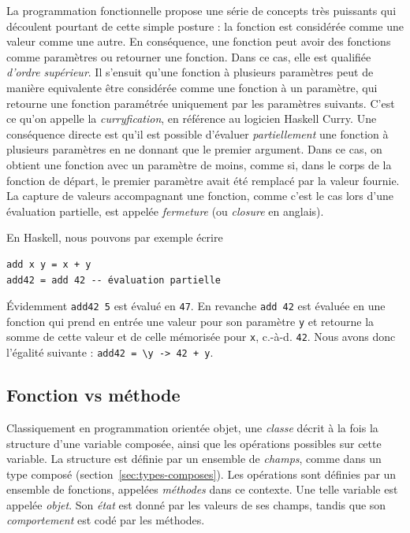 \documentclass[a4paper,francais]{insalyon}
\newcommand{\cad}{c.-à-d.}
\begin{document}
La programmation fonctionnelle propose une série de concepts très puissants qui découlent pourtant de cette simple posture : la fonction est considérée comme une valeur comme une autre. En conséquence, une fonction peut avoir des fonctions comme paramètres ou retourner une fonction. Dans ce cas, elle est qualifiée \emph{d'ordre supérieur}. Il s'ensuit qu'une fonction à plusieurs paramètres peut de manière equivalente être considérée comme une fonction à un paramètre, qui retourne une fonction paramétrée uniquement par les paramètres suivants. C'est ce qu'on appelle la \emph{curryfication}, en référence au logicien Haskell Curry. Une conséquence directe est qu'il est possible d'évaluer \emph{partiellement} une fonction à plusieurs paramètres en ne donnant que le premier argument. Dans ce cas, on obtient une fonction avec un paramètre de moins, comme si, dans le corps de la fonction de départ, le premier paramètre avait été remplacé par la valeur fournie. La capture de valeurs accompagnant une fonction, comme c'est le cas lors d'une évaluation partielle, est appelée \emph{fermeture} (ou \emph{closure} en anglais). 

En Haskell, nous pouvons par exemple écrire
\begin{verbatim}
add x y = x + y
add42 = add 42 -- évaluation partielle 
\end{verbatim}
\'Evidemment \verb!add42 5! est évalué en \texttt{47}. En revanche \verb!add 42! est évaluée en une fonction qui prend en entrée une valeur pour son paramètre \texttt{y} et retourne la somme de cette valeur et de celle mémorisée pour \texttt{x}, {\cad} \texttt{42}. Nous avons donc l'égalité suivante : \verb!add42 = \y -> 42 + y!. 


\subsection{Fonction vs méthode}
\label{sec:fonction-methode}

Classiquement en programmation orientée objet, une \emph{classe} décrit à la fois la structure d'une variable composée, ainsi que les opérations possibles sur cette variable. La structure est définie par un ensemble de \emph{champs}, comme dans un type composé (section~\ref{sec:types-composes}). Les opérations sont définies par un ensemble de fonctions, appelées \emph{méthodes} dans ce contexte. Une telle variable est appelée \emph{objet}. Son \emph{état} est donné par les valeurs de ses champs, tandis que son \emph{comportement} est codé par les méthodes.   
\end{document}
